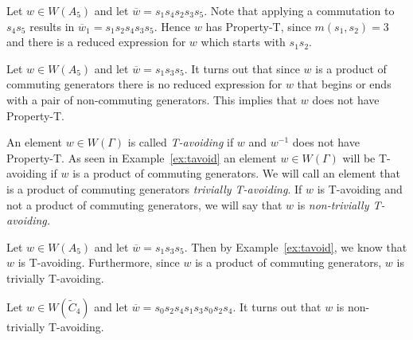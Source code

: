 \begin{example}
Let $w \in W(A_5)$ and let $\overline{w}=s_1s_4s_2s_3s_5$. Note that applying a commutation to $s_4s_5$ results in $\overline{w}_1=s_1s_2s_4s_3s_5$. Hence $w$ has Property-T, since $m(s_1,s_2)=3$ and there is a reduced expression for $w$ which starts with $s_1s_2$.	
\end{example}

\begin{example}\label{ex:tavoid}
Let $w \in W(A_5)$ and let $\overline{w}=s_1s_3s_5$. It turns out that since $w$ is a product of commuting generators there is no reduced expression for $w$ that begins or ends with a pair of non-commuting generators. This implies that $w$ does not have Property-T.	
\end{example}

An element $w \in W(\Gamma)$ is called \emph{T-avoiding} if $w$ and $w^{-1}$ does not have Property-T. As seen in Example~\ref{ex:tavoid} an element $w \in W(\Gamma)$ will be T-avoiding if $w$ is a product of commuting generators. We will call an element that is a product of commuting generators \emph{trivially T-avoiding}. If $w$ is T-avoiding and not a product of commuting generators, we will say that $w$ is \emph{non-trivially T-avoiding.}

\begin{example}
Let $w \in W(A_5)$ and let $\overline{w}=s_1s_3s_5$. Then by Example~\ref{ex:tavoid}, we know that $w$ is T-avoiding. Furthermore, since $w$ is a product of commuting generators, $w$ is trivially T-avoiding.	
\end{example}

\begin{example}
Let $w \in W(\widetilde{C}_4)$ and let $\overline{w}=s_0s_2s_4s_1s_3s_0s_2s_4$. It turns out that $w$ is non-trivially T-avoiding. 	
\end{example}

